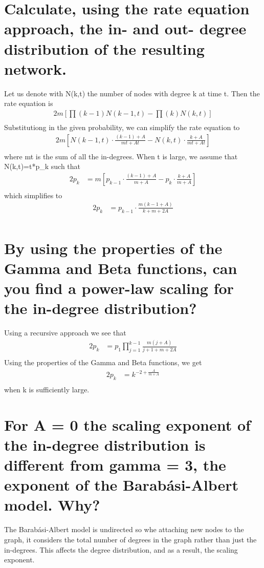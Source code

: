 \documentclass{article}%
\begin{document}
%
\normalsize%
\section{Calculate, using the rate equation approach, the in{-} and out{-} degree distribution of the resulting network.}%
\label{sec:Calculate,usingtherateequationapproach,thein{-}andout{-}degreedistributionoftheresultingnetwork.}%
Let us denote with N(k,t) the number of nodes with degree k at time t. Then the rate equation is%
\begin{alignat*}{2}%
m[\prod(k-1)N(k-1,t)-\prod(k)N(k,t)]\\%
\end{alignat*}%
Substitutiong in the given probability, we can simplify the rate equation to%
\begin{alignat*}{2}%
m[N(k-1,t)\cdot\frac{(k-1)+A}{mt+At}-N(k,t)\cdot\frac{k+A}{mt+At}]\\%
\end{alignat*}%
where mt is the sum of all the in{-}degrees.%
When t is large, we assume that N(k,t)=t*p\_k such that%
\begin{alignat*}{2}%
p_k&=m[p_{k-1}\cdot\frac{(k-1)+A}{m+A}-p_k\cdot\frac{k+A}{m+A}]\\%
\end{alignat*}%
which simplifies to%
\begin{alignat*}{2}%
p_k&=p_{k-1}\cdot\frac{m(k-1+A)}{k+m+2A}\\%
\end{alignat*}

%
\section{By using the properties of the Gamma and Beta functions, can you find a power{-}law scaling for the in{-}degree distribution?}%
\label{sec:ByusingthepropertiesoftheGammaandBetafunctions,canyoufindapower{-}lawscalingforthein{-}degreedistribution?}%
Using a recursive approach we see that%
\begin{alignat*}{2}%
p_k&=p_1\prod_{j=1}^{k-1}\frac{m(j+A)}{j+1+m+2A}\\%
\end{alignat*}%
Using the properties of the Gamma and Beta functions, we get%
\begin{alignat*}{2}%
p_k&=k^{-2+\frac{A}{m+A}}\\%
\end{alignat*}%
when k is sufficiently large.

%
\section{For A = 0 the scaling exponent of the in{-}degree distribution is different from gamma = 3, the exponent of the Barabási{-}Albert model. Why?}%
\label{sec:ForA=0thescalingexponentofthein{-}degreedistributionisdifferentfromgamma=3,theexponentoftheBarabsi{-}Albertmodel.Why?}%
The Barabási{-}Albert model is undirected so whe attaching new nodes to the graph, it considers the total number of degrees in the graph rather than just the in{-}degrees. This affects the degree distribution, and as a result, the scaling exponent.

%
\end{document}

